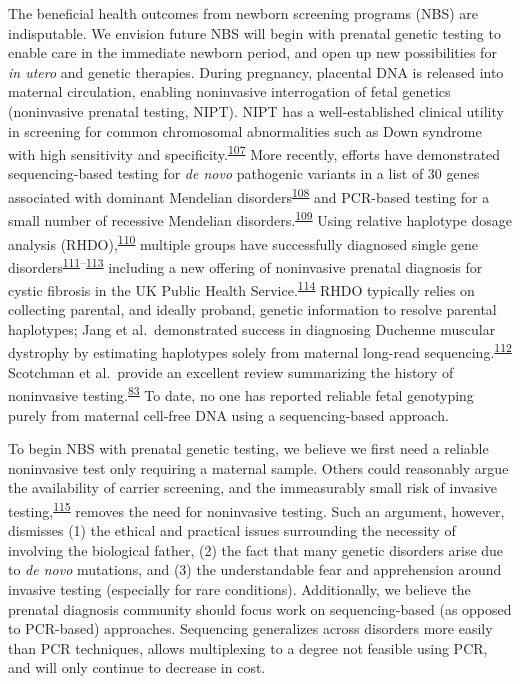 \documentclass[11pt,letterpaper]{book}
\begin{document}
The beneficial health outcomes from newborn screening programs (NBS) are indisputable.
We envision future NBS will begin with prenatal genetic testing to enable care in the immediate newborn period, and open up new possibilities for \emph{in utero} and genetic therapies.
During pregnancy, placental DNA is released into maternal circulation, enabling noninvasive interrogation of fetal genetics (noninvasive prenatal testing, NIPT).
NIPT has a well-established clinical utility in screening for common chromosomal abnormalities such as Down syndrome with high sensitivity and specificity.\textsuperscript{\protect\hyperlink{ref-mackie:2017aa}{107}}
More recently, efforts have demonstrated sequencing-based testing for \emph{de novo} pathogenic variants in a list of 30 genes associated with dominant Mendelian disorders\textsuperscript{\protect\hyperlink{ref-zhang:2019aa}{108}} and PCR-based testing for a small number of recessive Mendelian disorders.\textsuperscript{\protect\hyperlink{ref-tsao:2019ab}{109}}
Using relative haplotype dosage analysis (RHDO),\textsuperscript{\protect\hyperlink{ref-lo:2010aa}{110}} multiple groups have successfully diagnosed single gene disorders\textsuperscript{\protect\hyperlink{ref-hui:2017aa}{111}--\protect\hyperlink{ref-vermeulen:2017aa}{113}} including a new offering of noninvasive prenatal diagnosis for cystic fibrosis in the UK Public Health Service.\textsuperscript{\protect\hyperlink{ref-chandler:2020aa}{114}}
RHDO typically relies on collecting parental, and ideally proband, genetic information to resolve parental haplotypes; Jang et al.~demonstrated success in diagnosing Duchenne muscular dystrophy by estimating haplotypes solely from maternal long-read sequencing.\textsuperscript{\protect\hyperlink{ref-jang:2018aa}{112}}
Scotchman et al.~provide an excellent review summarizing the history of noninvasive testing.\textsuperscript{\protect\hyperlink{ref-scotchman:2020aa}{83}}
To date, no one has reported reliable fetal genotyping purely from maternal cell-free DNA using a sequencing-based approach.

To begin NBS with prenatal genetic testing, we believe we first need a reliable noninvasive test only requiring a maternal sample.
Others could reasonably argue the availability of carrier screening, and the immeasurably small risk of invasive testing,\textsuperscript{\protect\hyperlink{ref-salomon:2019aa}{115}} removes the need for noninvasive testing.
Such an argument, however, dismisses (1) the ethical and practical issues surrounding the necessity of involving the biological father, (2) the fact that many genetic disorders arise due to \emph{de novo} mutations, and (3) the understandable fear and apprehension around invasive testing (especially for rare conditions).
Additionally, we believe the prenatal diagnosis community should focus work on sequencing-based (as opposed to PCR-based) approaches.
Sequencing generalizes across disorders more easily than PCR techniques, allows multiplexing to a degree not feasible using PCR, and will only continue to decrease in cost.
\end{document}
